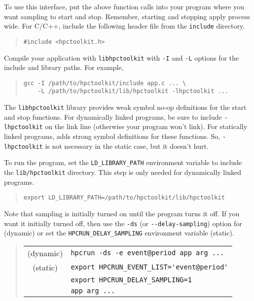 To use this interface, put the above function calls into your program
where you want sampling to start and stop.  Remember, starting and
stopping apply process wide.  For C/C++, include the following header
file from the \HPCToolkit{} \verb|include| directory.

\begin{quote}
\begin{verbatim}
#include <hpctoolkit.h>
\end{verbatim}
\end{quote}

Compile your application with \verb|libhpctoolkit| with \verb|-I| and
\verb|-L| options for the include and library paths.  For example,

\begin{quote}
\begin{verbatim}
gcc -I /path/to/hpctoolkit/include app.c ... \
    -L /path/to/hpctoolkit/lib/hpctoolkit -lhpctoolkit ...
\end{verbatim}
\end{quote}

The \verb|libhpctoolkit| library provides weak symbol no-op definitions
for the start and stop functions.  For dynamically linked programs, be
sure to include \verb|-lhpctoolkit| on the link line (otherwise your
program won't link).  For statically linked programs, \hpclink{} adds
strong symbol definitions for these functions.  So, \verb|-lhpctoolkit|
is not necessary in the static case, but it doesn't hurt.

To run the program, set the \verb|LD_LIBRARY_PATH| environment
variable to include the \HPCToolkit{} \verb|lib/hpctoolkit| directory.
This step is only needed for dynamically linked programs.

\begin{quote}
\begin{verbatim}
export LD_LIBRARY_PATH=/path/to/hpctoolkit/lib/hpctoolkit
\end{verbatim}
\end{quote}

Note that sampling is initially turned on until the program turns it
off.  If you want it initially turned off, then use the \verb|-ds| (or
\verb|--delay-sampling|) option for \hpcrun{} (dynamic) or set the
\verb|HPCRUN_DELAY_SAMPLING| environment variable (static).

\begin{quote}
\begin{tabular}{@{}cl}
(dynamic) & \verb|hpcrun -ds -e event@period app arg ...|  \\
(static)  & \verb|export HPCRUN_EVENT_LIST='event@period'| \\
& \verb|export HPCRUN_DELAY_SAMPLING=1| \\
& \verb|app arg ...|
\end{tabular}
\end{quote}

